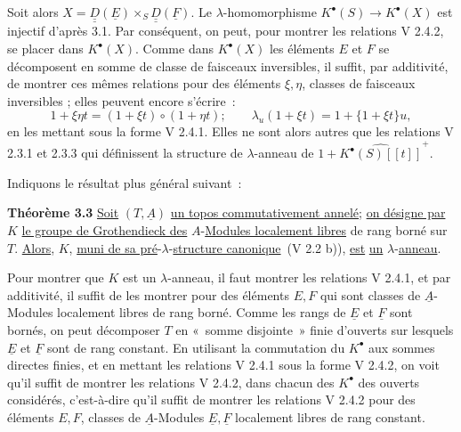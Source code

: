 
Soit alors \(X=\underline{\underline{D}}(\underline{E})\times_S \underline{\underline{D}}(\underline{F})\). Le \(\lambda\)-homomorphisme \(K^{\bullet}(S)\to K^{\bullet}(X)\) est injectif d'après 3.1. Par conséquent, on peut, pour montrer les relations V 2.4.2, se placer dans \(K^{\bullet}(X)\). Comme dans \(K^{\bullet}(X)\) les éléments \(E\) et \(F\) se décomposent en somme de classe de faisceaux inversibles, il suffit, par additivité, de montrer ces mêmes relations pour des éléments \(\xi,\eta\), classes de faisceaux inversibles ; elles peuvent encore s'écrire~:
\[
  1+\xi\eta t=(1+\xi t)\circ(1+\eta t);
  \qquad
  \lambda_u(1+\xi t)=1+\{1+\xi t\}u,
\]
en les mettant sous la forme V 2.4.1. Elles ne sont alors autres que les relations V 2.3.1 et 2.3.3 qui définissent la structure de \(\lambda\)-anneau de \(1+\widehat{K^{\bullet}(S)[[t]]}^{+}\).

Indiquons le résultat plus général suivant~:

\textbf{Théorème 3.3} \uline{Soit} \((T,\underline{A})\) \uline{un topos commutativement annelé}; \uline{on désigne par} \(K\) \uline{le groupe de Grothendieck des} \(A\)-\uline{Modules localement libres} de rang borné sur \(T\). \uline{Alors}, \(K\), \uline{muni de sa pré}-\(\lambda\)-\uline{structure canonique}~(V 2.2 b)), \uline{est} \uline{un} \(\lambda\)-\uline{anneau}.

Pour montrer que \(K\) est un \(\lambda\)-anneau, il faut montrer les relations V 2.4.1, et par additivité, il suffit de les montrer pour des éléments \(E,F\) qui sont classes de \(\underline{A}\)-Modules localement libres de rang borné. Comme les rangs de \(\underline{E}\) et \(\underline{F}\) sont bornés, on peut décomposer \(T\) en «~somme disjointe~» finie d'ouverts sur lesquels \(\underline{E}\) et \(\underline{F}\) sont de rang constant. En utilisant la commutation du \(K^{\bullet}\) aux sommes directes finies, et en mettant les relations V 2.4.1 sous la forme V 2.4.2, on voit qu'il suffit de montrer les relations V 2.4.2, dans chacun des \(K^{\bullet}\) des ouverts considérés, c'est-à-dire qu'il suffit de montrer les relations V 2.4.2 pour des éléments \(E,F\), classes de \(\underline{A}\)-Modules \(\underline{E},\underline{F}\) localement libres de rang constant.

